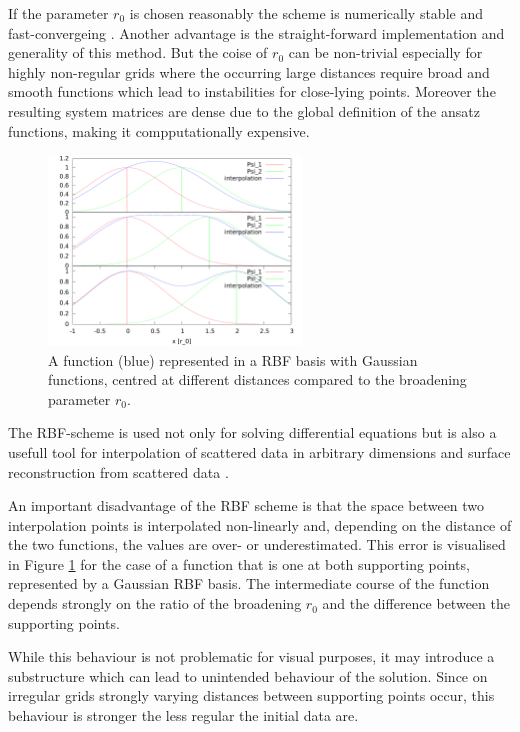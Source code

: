 If the parameter $r_0$ is chosen reasonably the scheme is numerically stable and fast-convergeing \cite{rbfSE}.
Another advantage is the straight-forward implementation and generality of this method.
But the coise of $r_0$ can be non-trivial especially for highly non-regular grids where the occurring large distances require broad and smooth functions which lead to instabilities for close-lying points.
Moreover the resulting system matrices are dense due to the global definition of the ansatz functions, making it compputationally expensive.
\begin{figure}
   \includegraphics[width=0.6\textwidth]{Figures/RBF/RBFerror}
   \caption{A function (blue) represented in a RBF basis with Gaussian functions, centred at different distances compared to the broadening parameter $r_0$.}
   \label{fig:rbfError}
\end{figure}

The RBF-scheme is used not only for solving differential equations but is also a usefull tool for interpolation of scattered data in arbitrary dimensions \cite{rbfInterpol} and surface reconstruction from scattered data \cite{rbfSurf}.

An important disadvantage of the RBF scheme is that the space between two interpolation points is interpolated non-linearly and, depending on the distance of the two functions, the values are over- or underestimated.
This error is visualised in Figure \ref{fig:rbfError} for the case of a function that is one at both supporting points, represented by a Gaussian RBF basis.
The intermediate course of the function depends strongly on the ratio of the broadening $r_0$ and the difference between the supporting points.

While this behaviour is not problematic for visual purposes, it may introduce a substructure which can lead to unintended behaviour of the solution.
Since on irregular grids strongly varying distances between supporting points occur, this behaviour is stronger the less regular the initial data are.

